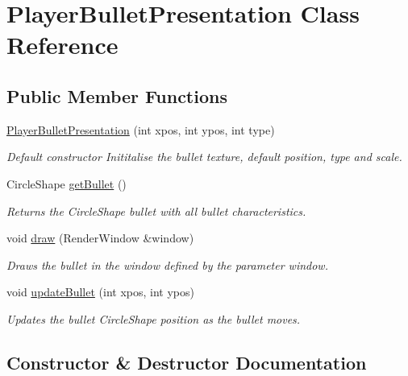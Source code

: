 \hypertarget{class_player_bullet_presentation}{}\section{Player\+Bullet\+Presentation Class Reference}
\label{class_player_bullet_presentation}
\subsection*{Public Member Functions}
\begin{DoxyCompactItemize}
\item 
\hyperlink{class_player_bullet_presentation_a23a5d5d48c4baf65bc2a9beea2a5e3ef}{Player\+Bullet\+Presentation} (int xpos, int ypos, int type)
\begin{DoxyCompactList}\small\item\em Default constructor Inititalise the bullet texture, default position, type and scale. \end{DoxyCompactList}\item 
Circle\+Shape \hyperlink{class_player_bullet_presentation_a1f41436f86e00e6f2de1c81d66218790}{get\+Bullet} ()
\begin{DoxyCompactList}\small\item\em Returns the Circle\+Shape bullet with all bullet characteristics. \end{DoxyCompactList}\item 
void \hyperlink{class_player_bullet_presentation_ad75fe9d4316fc438389e1f323ac2c646}{draw} (Render\+Window \&window)
\begin{DoxyCompactList}\small\item\em Draws the bullet in the window defined by the parameter window. \end{DoxyCompactList}\item 
void \hyperlink{class_player_bullet_presentation_ad8a28adf4326c03c52af77c7b91c5a0a}{update\+Bullet} (int xpos, int ypos)
\begin{DoxyCompactList}\small\item\em Updates the bullet Circle\+Shape position as the bullet moves. \end{DoxyCompactList}\end{DoxyCompactItemize}


\subsection{Constructor \& Destructor Documentation}
\mbox{\label{class_player_bullet_presentation_a23a5d5d48c4baf65bc2a9beea2a5e3ef}} 
